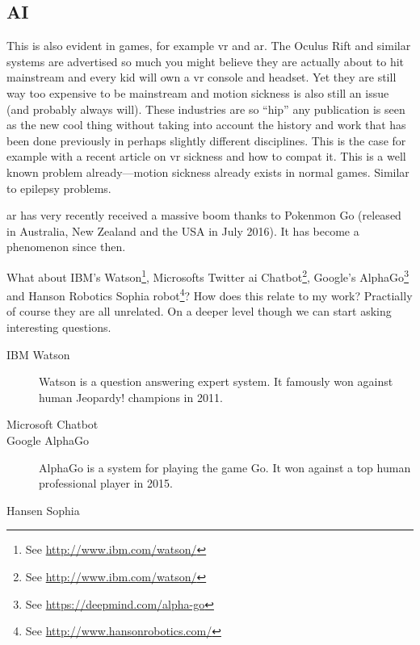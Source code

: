\subsection{AI}
This is also evident in games, for example \gls{vr} and \gls{ar}. The Oculus Rift and similar systems are advertised so much you might believe they are actually about to hit mainstream and every kid will own a \gls{vr} console and headset. Yet they are still way too expensive to be mainstream and motion sickness is also still an issue (and probably always will). These industries are so ``hip'' any publication is seen as the new cool thing without taking into account the history and work that has been done previously in perhaps slightly different disciplines. This is the case for example with a recent article on \gls{vr} sickness and how to compat it. This is a well known problem already---motion sickness already exists in normal games. Similar to epilepsy problems.


\gls{ar} has very recently received a massive boom thanks to Pokenmon Go (released in Australia, New Zealand and the USA in July 2016). It has become a phenomenon since then.

What about IBM's Watson\footnote{See \url{http://www.ibm.com/watson/}}, Microsofts Twitter \gls{ai} Chatbot\footnote{See \url{http://www.ibm.com/watson/}}, Google's AlphaGo\footnote{See \url{https://deepmind.com/alpha-go}} and Hanson Robotics Sophia robot\footnote{See \url{http://www.hansonrobotics.com/}}? How does this relate to my work? Practially of course they are all unrelated. On a deeper level though we can start asking interesting questions. 

\begin{description}
  \item[IBM Watson] Watson is a question answering expert system. It famously won against human Jeopardy! champions in 2011.
  \item[Microsoft Chatbot] 
  \item[Google AlphaGo] AlphaGo is a system for playing the game Go. It won against a top human professional player in 2015.
  \item[Hansen Sophia]
\end{description}

